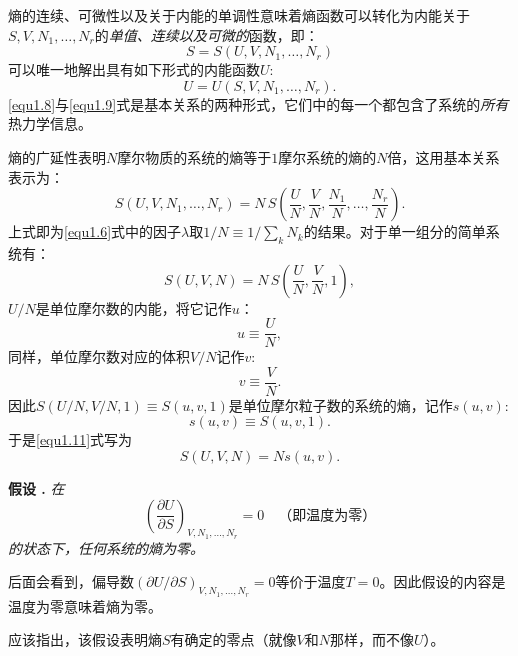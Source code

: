 熵的连续、可微性以及关于内能的单调性意味着熵函数可以转化为内能关于$S, V, N_1, \dots, N_r$的{\it 单值、连续以及可微的}函数，即：
\begin{equation}
\label{equ1.8}
	S = S(U, V, N_1, \dots, N_r)
\end{equation}
可以唯一地解出具有如下形式的内能函数$U$:
\begin{equation}
\label{equ1.9}
	U = U(S, V, N_1, \dots, N_r).
\end{equation}
\eqref{equ1.8}与\eqref{equ1.9}式是基本关系的两种形式，它们中的每一个都包含了系统的{\it 所有}热力学信息。

熵的广延性表明$N$摩尔物质的系统的熵等于$1$摩尔系统的熵的$N$倍，这用基本关系表示为：
\begin{equation}
\label{equ1.10}
	S(U, V, N_1, \dots, N_r) = N\, S \left( \frac{U}{N}, \frac{V}{N}, \frac{N_1}{N}, \dots, \frac{N_r}{N} \right).
\end{equation}
上式即为\eqref{equ1.6}式中的因子$\lambda$取$1/N \equiv 1 / \sum_k N_k$的结果。对于单一组分的简单系统有：
\begin{equation}
\label{equ1.11}
	S(U, V, N) = N\, S \left( \frac{U}{N}, \frac{V}{N}, 1 \right),
\end{equation}
$U/N$是单位摩尔数的内能，将它记作$u$：
\begin{equation}
\label{equ1.12}
	u \equiv \frac{U}{N},
\end{equation}
同样，单位摩尔数对应的体积$V/N$记作$v$:
\begin{equation}
\label{equ1.13}
	v \equiv \frac{V}{N}.
\end{equation}
因此$S(U/N, V/N, 1) \equiv S(u, v, 1)$是单位摩尔粒子数的系统的熵，记作$s(u, v)$:
\begin{equation}
\label{equ1.14}
	s(u, v) \equiv S(u, v, 1).
\end{equation}
于是\eqref{equ1.11}式写为
\begin{equation}
\label{equ1.15}
	S(U, V, N) = N s(u, v).
\end{equation}

{\bf 假设 \uppercase\expandafter{}. } {\it 
在\[ \left( \frac{\partial U}{\partial S} \right)_{V, N_1, \dots, N_r} = 0 \quad \text{（即温度为零）} \]的状态下，任何系统的熵为零。
}

后面会看到，偏导数$(\partial U / \partial S)_{V, N_1, \dots, N_r} = 0$等价于温度$T = 0$。因此假设\uppercase\expandafter{}的内容是温度为零意味着熵为零。

应该指出，该假设表明熵$S$有确定的零点（就像$V$和$N$那样，而不像$U$）。

